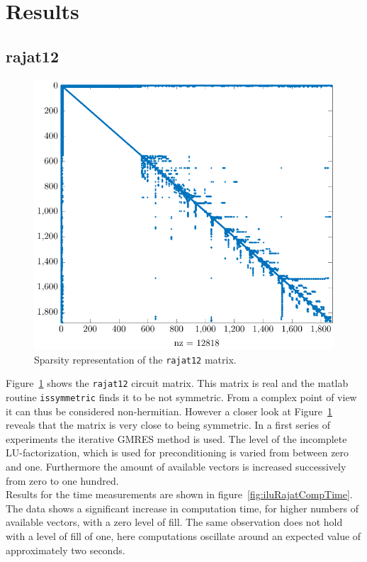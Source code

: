 \section{Results}

\subsection{rajat12}
\begin{figure}
\centering
\includegraphics[scale=0.8]{../src/figure/rajat12.pdf}
\caption{Sparsity representation of the \texttt{rajat12} matrix.}
\label{fig:rajat12}
\end{figure}
Figure~\ref{fig:rajat12} shows the \texttt{rajat12} circuit matrix. This matrix is real and the matlab routine \texttt{issymmetric} finds it to be not symmetric. From a complex point of view it can thus be considered non-hermitian. However a closer look at Figure~\ref{fig:rajat12} reveals that the matrix is very close to being symmetric. In a first series of experiments the iterative GMRES method is used. The level of the incomplete LU-factorization, which is used for preconditioning is varied from between zero and one. Furthermore the amount of available vectors is increased successively from zero to one hundred. \\
Results for the time measurements are shown in figure~\ref{fig:iluRajatCompTime}. The data shows a significant increase in computation time, for higher numbers of available vectors, with a zero level of fill. The same observation does not hold with a level of fill of one, here computations oscillate around an expected value of approximately two seconds. \\
